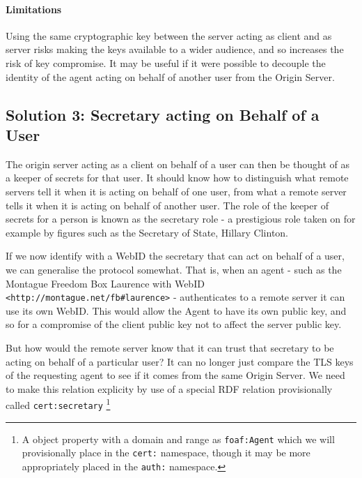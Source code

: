 \documentclass[a4paper]{llncs}
\begin{document}
\paragraph{Limitations}

Using the same cryptographic key between the server acting as client and as server risks making the keys available to a wider audience, and so increases the risk of key compromise. 
It may be useful if it were possible to decouple the identity of the agent acting on behalf of another user from the Origin Server.


\subsection{Solution 3: Secretary acting on Behalf of a User}

The origin server acting as a client on behalf of a user can then be thought of as a keeper of secrets for that user.
It should know how to distinguish what remote servers tell it when it is acting on behalf of one user, from what a remote server tells it when it is acting on behalf of another user.
The role of the keeper of secrets for a person is known as the secretary role - a prestigious role taken on for example by figures such as the Secretary of State, Hillary Clinton.

If we now identify with a WebID the secretary that can act on behalf of a user, we can generalise the protocol somewhat.
That is, when an agent - such as the Montague Freedom Box Laurence with WebID \lstinline|<http://montague.net/fb#laurence>| - authenticates to a remote server it can use its own WebID. 
This would allow the Agent to have its own public key, and so for a compromise of the client public key not to affect the server public key.

But how would the remote server know that it can trust that secretary to be acting on behalf of a particular user?
It can no longer just compare the TLS keys of the requesting agent to see if it comes from the same Origin Server.
We need to make this relation explicity by use of a special RDF relation provisionally called \lstinline|cert:secretary|%
\footnote{A object property with a domain and range as \lstinline|foaf:Agent| which we will provisionally place
in the \lstinline|cert:| namespace, though it may be more appropriately placed in the \lstinline|auth:| namespace.}
\end{document}
